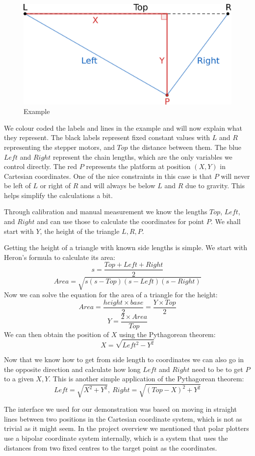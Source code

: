 \documentclass[12pt]{article}
\begin{document}
\begin{figure}[t]
  \centering
  \includegraphics[width=.5\textwidth]{img/drowbot-maths.eps}
  \caption{Example}
  \label{fig:maths}
\end{figure}

We colour coded the labels and lines in the example and will now
explain what they represent.
The black labels represent fixed constant values with $L$ and $R$
representing the stepper motors, and $Top$ the distance between them.
The blue $Left$ and $Right$ represent the chain lengths, which are
the only variables we control directly.
The red $P$ represents the platform at position $(X,Y)$ in Cartesian
coordinates.
One of the nice constraints in this case is that $P$ will never be
left of $L$ or right of $R$ and will always be below $L$ and $R$ due
to gravity. This helps simplify the calculations a bit.

Through calibration and manual measurement we know the lengths $Top$,
$Left$, and $Right$ and can use those to calculate the coordinates
for point $P$.
We shall start with $Y$, the height of the triangle $L,R,P$.

Getting the height of a triangle with known side lengths is simple.
We start with Heron's formula to calculate its area:
$$s = \frac{Top + Left + Right}{2}$$
$$Area = \sqrt{s(s-Top)(s-Left)(s-Right)}$$
%
Now we can solve the equation for the area of a triangle for the height:
$$Area = \frac{height \times base}{2} = \frac{Y \times Top}{2}$$
$$Y = \frac{2 \times Area}{Top}$$
%
We can then obtain the position of $X$ using the Pythagorean theorem:
$$X = \sqrt{Left^2 - Y^2}$$

Now that we know how to get from side length to coordinates we can
also go in the opposite direction and calculate how long $Left$ and
$Right$ need to be to get $P$ to a given $X,Y$.
This is another simple application of the Pythagorean theorem:
$$Left = \sqrt{X^2 + Y^2},\ Right = \sqrt{(Top - X)^2 + Y^2}$$

The interface we used for our demonstration was based on moving
in straight lines between two positions in the Cartesian coordinate
system, which is not as trivial as it might seem.
In the project overview we mentioned that polar plotters use a
bipolar coordinate system internally, which is a system that uses
the distances from two fixed centres to the target point as the
coordinates.
\end{document}
